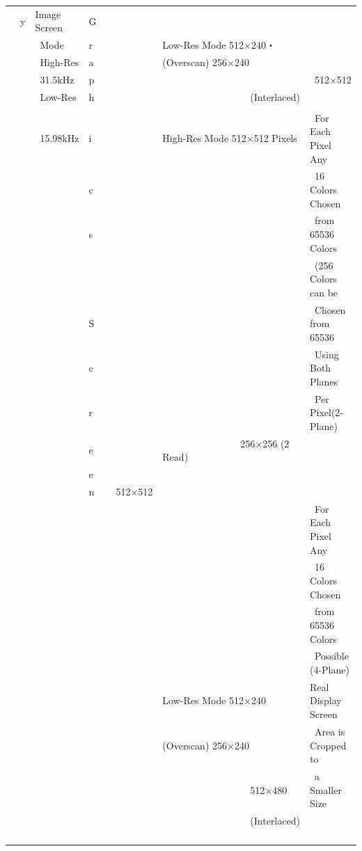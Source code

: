 \documentclass[twoside,a4paper,12pt]{article}
\begin{document}
\begin{tabular}{|p{13mm}|p{23mm}|p{4mm}|p{20mm}|p{65mm}|p{36mm}|}
\ \ y & Image Screen & G & & &\\[2mm]
& \ Mode & r & & Low-Res Mode 512×240・ &\\[2mm]
& \ High-Res & a & & (Overscan) 256×240 &\\[2mm]
& \ 31.5kHz & p & & & \ 512×512\\[2mm]
& \ Low-Res & h & & \ \ \ \ \ \ \ \ \ \ \ \ \ \ \ \ \ \ (Interlaced) &\\
\cline{5-6}
& & & & &\\[-4mm]
& \ 15.98kHz & i & & High-Res Mode 512×512 Pixels & \ For Each Pixel Any\\
& & c & & & \ 16 Colors Chosen\\
& & s & & & \ from 65536 Colors\\
& & & & & \ (256 Colors can be\\
& & S & & & \ Chosen from 65536\\
& & c & & & \ Using Both Planes\\
& & r & & & \ Per Pixel(2-Plane)\\
& & e & & \ \ \ \ \ \ \ \ \ \ \ \ \ \ \ \ 256×256 (2 Read) &\\
& & e & & &\\
& & n & \ \ 512×512 & &\\
& & & & & \ For Each Pixel Any\\
& & & & & \ 16 Colors Chosen\\
& & & & & \ from 65536 Colors\\
& & & & & \ Possible (4-Plane)\\
& & & & Low-Res Mode 512×240	& Real Display Screen\\
& & & & (Overscan) 256×240 & \ Area is Cropped to\\
& & & & \ \ \ \ \ \ \ \ \ \ \ \ \ \ \ \ \ \ 512×480 & \ a Smaller Size\\
& & & & \ \ \ \ \ \ \ \ \ \ \ \ \ \ \ \ \ \ (Interlaced) &\\
& & & & &\\
& & & & &\\
& & & & &\\
& & & & &\\
\hline
\end{tabular}

\newpage
\end{document}
